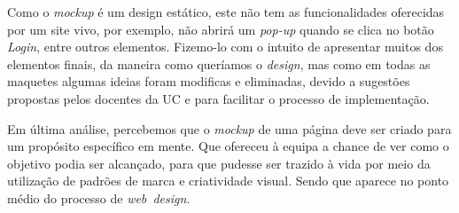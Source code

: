 \documentclass[11pt,a4paper]{report}
\begin{document}
Como o \emph{mockup} é um design estático, este não tem as funcionalidades oferecidas por um site vivo, por exemplo, não abrirá um \emph{pop-up} quando se clica no botão \emph{Login}, entre outros elementos. Fizemo-lo com o intuito de apresentar muitos dos elementos finais, da maneira como queríamos o \emph{design}, mas como em todas as maquetes algumas ideias foram modificas e eliminadas, devido a sugestões propostas pelos docentes da UC e para facilitar o processo de implementação.

Em última análise, percebemos que o \emph{mockup} de uma página deve ser criado para um propósito específico em mente. Que ofereceu à equipa a chance de ver como o objetivo podia ser alcançado, para que pudesse ser trazido à vida por meio da utilização de padrões de marca e criatividade visual. Sendo que aparece no ponto médio do processo de \emph{web\ design}.
\end{document}
